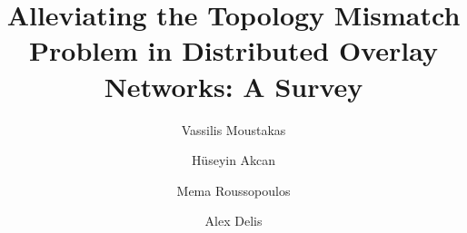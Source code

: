 \documentclass[final,5p,times,twocolumn,authoryear]{elsarticle}
\begin{document}
\begin{frontmatter}



\title{Alleviating the Topology Mismatch Problem in Distributed Overlay Networks: A Survey}


% 


\author[rvt0]{Vassilis Moustakas} %
\author[focal]{H\"useyin Akcan} %
\author[rvt]{Mema Roussopoulos} %
\author[rvt]{Alex Delis} %
\address[rvt0]{Amazon Development Center Germany GmbH, Marcel-Breuer Str. 12, 80807 Munich, Germany}
\address[focal]{Department of Software Engineering, Izmir University of Economics, 35330 Balcova, Izmir, Turkey}
\address[rvt]{Department of Informatics and Telecommunications, University of Athens, Athens, 15703, Greece}


\end{frontmatter}
\end{document}
